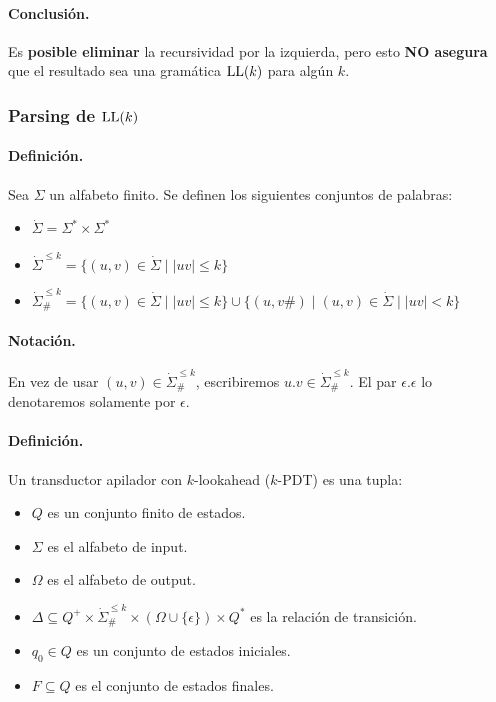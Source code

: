     \paragraph{Conclusión.} Es \textbf{posible eliminar} la recursividad por la izquierda, pero esto \textbf{NO asegura} que el resultado sea una gramática $\text{LL}(k)$ para algún $k$.

    \subsubsection[Parsing de LL(k)]{Parsing de $\text{LL}(k)$}

    \paragraph{Definición.} Sea $\Sigma$ un alfabeto finito. Se definen los siguientes conjuntos de palabras:
    \begin{itemize}
        \item $\dot{\Sigma}= \Sigma^* \times \Sigma^*$
        \item $\dot{\Sigma}^{\le k} = \{ (u,v) \in \dot{\Sigma} \mid |uv| \le k \}$
        \item $\dot{\Sigma}_{\#}^{\le k} = \{ (u,v) \in \dot{\Sigma} \mid |uv| \le k \} \cup \{ (u,v\#) \mid (u,v) \in \dot{\Sigma} \mid |uv| < k \}$
    \end{itemize}

    \paragraph{Notación.} En vez de usar $(u,v) \in \dot{\Sigma}_{\#}^{\le k}$, escribiremos $u.v \in \dot{\Sigma}_{\#}^{\le k}$. El par $\epsilon.\epsilon$ lo denotaremos solamente por $\epsilon$.

    \paragraph{Definición.} Un transductor apilador con $k$-lookahead ($k$-PDT) es una tupla:

    \begin{itemize}
        \item $Q$ es un conjunto finito de estados.
        \item $\Sigma$ es el alfabeto de input.
        \item $\Omega$ es el alfabeto de output.
        \item $\Delta \subseteq Q^{+} \times \dot{\Sigma}_{\#}^{\leq k} \times(\Omega \cup\{\epsilon\}) \times Q^*$ es la relación de transición.
        \item $q_0 \in Q$ es un conjunto de estados iniciales.
        \item $F \subseteq Q$ es el conjunto de estados finales.
    \end{itemize}

